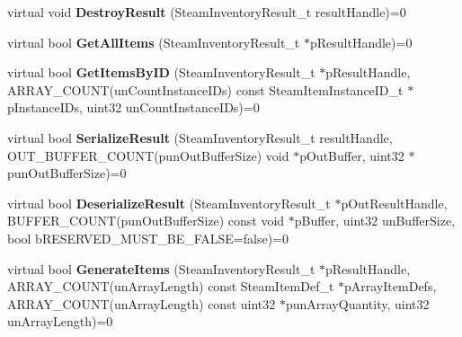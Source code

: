\begin{DoxyCompactItemize}
\mbox{\label{class_i_steam_inventory_a66443e508312e8475d88a6de80da180b}} 
virtual void {\bfseries Destroy\+Result} (Steam\+Inventory\+Result\+\_\+t result\+Handle)=0
\item 
\mbox{\label{class_i_steam_inventory_a55ee62875c7d7c667bcdf730e70512ac}} 
virtual bool {\bfseries Get\+All\+Items} (Steam\+Inventory\+Result\+\_\+t $\ast$p\+Result\+Handle)=0
\item 
\mbox{\label{class_i_steam_inventory_aa4b1ae2e6c436e0524aad80556195389}} 
virtual bool {\bfseries Get\+Items\+By\+ID} (Steam\+Inventory\+Result\+\_\+t $\ast$p\+Result\+Handle, A\+R\+R\+A\+Y\+\_\+\+C\+O\+U\+NT(un\+Count\+Instance\+I\+Ds) const Steam\+Item\+Instance\+I\+D\+\_\+t $\ast$p\+Instance\+I\+Ds, uint32 un\+Count\+Instance\+I\+Ds)=0
\item 
\mbox{\label{class_i_steam_inventory_a5d58eca15c7a41b277a5c08bb59534a6}} 
virtual bool {\bfseries Serialize\+Result} (Steam\+Inventory\+Result\+\_\+t result\+Handle, O\+U\+T\+\_\+\+B\+U\+F\+F\+E\+R\+\_\+\+C\+O\+U\+NT(pun\+Out\+Buffer\+Size) void $\ast$p\+Out\+Buffer, uint32 $\ast$pun\+Out\+Buffer\+Size)=0
\item 
\mbox{\label{class_i_steam_inventory_a678f007cac45a1683f2916881dabf9cb}} 
virtual bool {\bfseries Deserialize\+Result} (Steam\+Inventory\+Result\+\_\+t $\ast$p\+Out\+Result\+Handle, B\+U\+F\+F\+E\+R\+\_\+\+C\+O\+U\+NT(pun\+Out\+Buffer\+Size) const void $\ast$p\+Buffer, uint32 un\+Buffer\+Size, bool b\+R\+E\+S\+E\+R\+V\+E\+D\+\_\+\+M\+U\+S\+T\+\_\+\+B\+E\+\_\+\+F\+A\+L\+SE=false)=0
\item 
\mbox{\label{class_i_steam_inventory_a9acdb37fd35757ad54105f8766557868}} 
virtual bool {\bfseries Generate\+Items} (Steam\+Inventory\+Result\+\_\+t $\ast$p\+Result\+Handle, A\+R\+R\+A\+Y\+\_\+\+C\+O\+U\+NT(un\+Array\+Length) const Steam\+Item\+Def\+\_\+t $\ast$p\+Array\+Item\+Defs, A\+R\+R\+A\+Y\+\_\+\+C\+O\+U\+NT(un\+Array\+Length) const uint32 $\ast$pun\+Array\+Quantity, uint32 un\+Array\+Length)=0
\item 
\mbox{\label{class_i_steam_inventory_a41e365e48e9c3f1a01737d9d10fc974f}} 

\end{DoxyCompactItemize}
